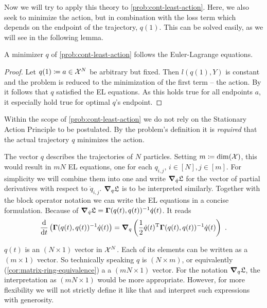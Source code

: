 Now we will try to apply this theory to \cref{prob:cont-least-action}.
Here, we also seek to minimize the action, but in combination with the loss term which depends on the endpoint of the trajectory, $q(1)$.
This can be solved easily, as we will see in the following lemma.
\begin{lemma}
	A minimizer $q$ of \cref{prob:cont-least-action} follows the Euler-Lagrange equations.
\end{lemma}
\begin{proof}
	Let $q(1) \coloneqq a \in \mathcal{X}^N$ be arbitrary but fixed.
	Then $l(q(1), Y)$ is constant and the problem is reduced to the minimization of the first term -- the action.
	By \cite[~Proposition 1.4.1]{kielhofer18} it follows that $q$ satisfied the EL equations.
	As this holds true for all endpoints $a$, it especially hold true for optimal $q$'s endpoint.
\end{proof}

Within the scope of \cref{prob:cont-least-action} we do not rely on the Stationary Action Principle to be postulated.
By the problem's definition it is \emph{required} that the actual trajectory $q$ minimizes the action.

The vector $q$ describes the trajectories of $N$ particles.
Setting $m \coloneqq \mathrm{dim}(\mathcal{X})$, this would result in $mN$ EL equations, one for each $q_{i, j}$, $i \in [N], j \in [m]$.
For simplicity we will combine them into one and write $\grad_{\dot{q}} \mathfrak{L}$ for the vector of partial derivatives with respect to $\dot{q}_{i, j}$.
$\grad_q \mathfrak{L}$ is to be interpreted similarly.
Together with the block operator notation we can write the EL equations in a concise formulation.
Because of $\grad_{\dot{q}} \mathfrak{L} = \mathbf{\Gamma}(q(t), q(t))^{-1} \dot{q}(t)$. It reads
\begin{equation}
\label{eq:concrete-lagrangian}
	\frac{\mathrm{d}}{\mathrm{d}t} \left(\mathbf{\Gamma}(q(t), q(t))^{-1} \dot{q}(t) \right)
	= \grad_q \left(\frac{1}{2} \dot{q}(t)^\mathrm{T} \mathbf{\Gamma}(q(t), q(t))^{-1} \dot{q}(t)\right) \ .
\end{equation}

$q(t)$ is an $(N\times1)$ vector in $\mathcal{X}^N$.
Each of its elements can be written as a $(m\times1)$ vector.
So technically speaking $q$ is $(N \times m)$, or equivalently (\cref{cor:matrix-ring-equivalence}) a a $(mN \times 1)$ vector.
For the notation $\grad_q \mathfrak{L}$, the interpretation as $(mN \times 1)$ would be more appropriate.
However, for more flexibility we will not strictly define it like that and interpret such expressions with generosity.